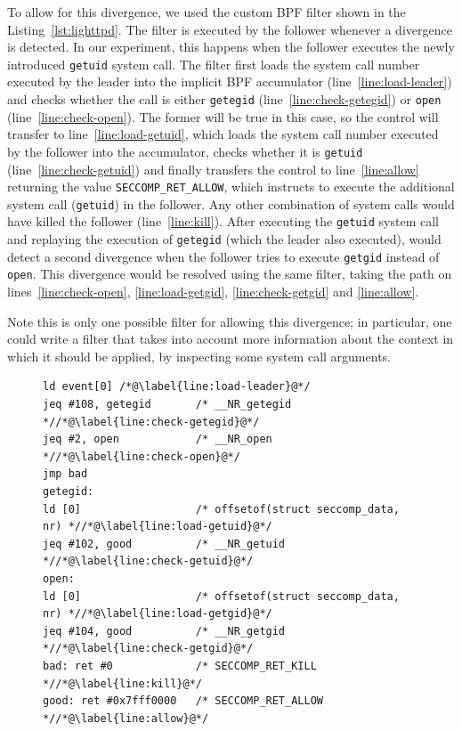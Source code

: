 To allow for this divergence, we used the custom BPF filter shown in
the Listing~\ref{lst:lighttpd}.  The filter is executed by the
follower whenever a divergence is detected.  In our experiment, this
happens when the follower executes the newly introduced
\lstinline`getuid` system call. The filter first loads the system call
number executed by the leader into the implicit BPF accumulator
(line~\ref{line:load-leader}) and checks whether the call is either
\lstinline`getegid` (line~\ref{line:check-getegid}) or
\lstinline`open` (line~\ref{line:check-open}).  The former will be
true in this case, so the control will transfer to
line~\ref{line:load-getuid}, which loads the system call number
executed by the follower into the accumulator, checks whether it is
\lstinline`getuid` (line~\ref{line:check-getuid}) and finally
transfers the control to line~\ref{line:allow} returning the value
\lstinline`SECCOMP_RET_ALLOW`, which instructs \varan to execute the
additional system call (\ie \lstinline`getuid`) in the follower.  Any
other combination of system calls would have killed the follower
(line~\ref{line:kill}). After executing the \lstinline`getuid` system
call and replaying the execution of \lstinline`getegid` (which the
leader also executed), \varan would detect a second divergence when
the follower tries to execute \lstinline`getgid` instead of
\lstinline`open`. This divergence would be resolved using the same
filter, taking the path on lines~\ref{line:check-open},
\ref{line:load-getgid}, \ref{line:check-getgid} and \ref{line:allow}.

Note this is only one possible filter for allowing this divergence; in
particular, one could write a filter that takes into account more
information about the context in which it should be applied, \eg by
inspecting some system call arguments.



\begin{figure}[t]
\begin{lstlisting}[label={lst:lighttpd},language={[bpf]Assembler},caption={Example of a BPF rewriting rule}]
ld event[0] /*@\label{line:load-leader}@*/
jeq #108, getegid       /* __NR_getegid *//*@\label{line:check-getegid}@*/
jeq #2, open            /* __NR_open *//*@\label{line:check-open}@*/
jmp bad
getegid:
ld [0]                  /* offsetof(struct seccomp_data, nr) *//*@\label{line:load-getuid}@*/
jeq #102, good          /* __NR_getuid *//*@\label{line:check-getuid}@*/
open:
ld [0]                  /* offsetof(struct seccomp_data, nr) *//*@\label{line:load-getgid}@*/
jeq #104, good          /* __NR_getgid *//*@\label{line:check-getgid}@*/
bad: ret #0             /* SECCOMP_RET_KILL *//*@\label{line:kill}@*/
good: ret #0x7fff0000   /* SECCOMP_RET_ALLOW *//*@\label{line:allow}@*/
\end{lstlisting}
\end{figure}

